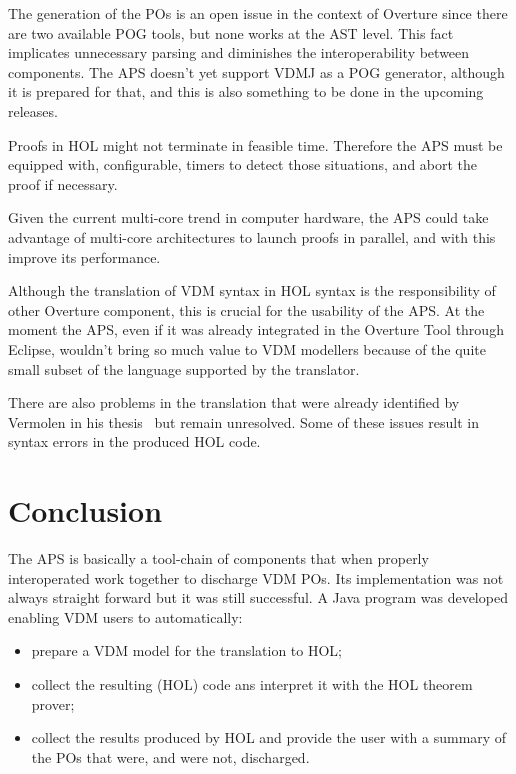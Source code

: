 \documentclass[]{article}
\begin{document}


The generation of the POs is an open issue in the context of Overture since there are two available POG tools, but none works at the AST level.
This fact implicates unnecessary parsing and diminishes the interoperability between components.
The APS doesn't yet support VDMJ as a POG generator, although it is prepared for that, and this is also something to be done in the upcoming releases.

Proofs in HOL might not terminate in feasible time.
Therefore the APS must be equipped with, configurable, timers to detect those situations, and abort the proof if necessary.

Given the current multi-core trend in computer hardware, the APS could take advantage of multi-core architectures to launch proofs in parallel, and with this improve its performance.

Although the translation of VDM syntax in HOL syntax is the responsibility of other Overture component, this is crucial for the usability of the APS.
At the moment the APS, even if it was already integrated in the Overture Tool through Eclipse, wouldn't bring so much value to VDM modellers because of the quite small subset of the language supported by the translator.

There are also problems in the translation that were already identified by Vermolen in his thesis~\cite[Section 7.3]{Vermolen07} but remain unresolved.
Some of these issues result in syntax errors in the produced HOL code.

\section{Conclusion}
\label{sec:conclusion}

The APS is basically a tool-chain of components that when properly interoperated work together to discharge VDM POs.
Its implementation was not always straight forward but it was still successful.
A Java program was developed enabling VDM users to automatically:
\begin{itemize}
  \item	prepare a VDM model for the translation to HOL;
  \item collect the resulting (HOL) code ans interpret it with the HOL theorem prover;
  \item collect the results produced by HOL and provide the user with a summary of the POs that were, and were not, discharged.
\end{itemize}
\end{document}
